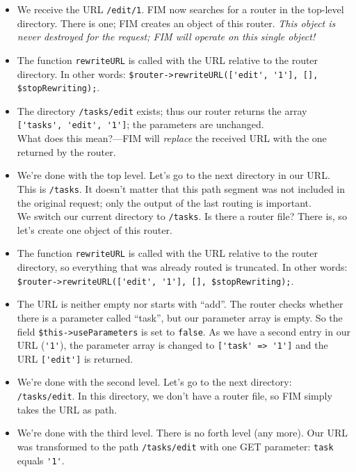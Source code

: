 \documentclass{scrartcl}
\begin{document}
      \begin{itemize}
         \item
            We receive the URL {\color{nbBlue}\texttt{/edit/1}}. FIM now searches for a router in the top-level directory. There is one; FIM creates an object of this router. \emph{This object is never destroyed for the request; FIM will operate on this single object!}
         \item
            The function \lstinline!rewriteURL! is called with the URL relative to the router directory. In other words:
            \lstinline!$router->rewriteURL(['edit', '1'], [], $stopRewriting);!.
         \item
            The directory {\color{nbGreen}\texttt{/tasks/edit}} exists; thus our router returns the array \lstinline!['tasks', 'edit', '1']!; the parameters are unchanged. \\
            What does this mean?---FIM will \emph{replace} the received URL with the one returned by the router.
         \item
            We're done with the top level. Let's go to the next directory in our URL. This is {\color{nbBlue}\texttt{/tasks}}. It doesn't matter that this path segment was not included in the original request; only the output of the last routing is important. \\
            We switch our current directory to {\color{nbGreen}\texttt{/tasks}}. Is there a router file? There is, so let's create one object of this router.
         \item
            The function \lstinline!rewriteURL! is called with the URL relative to the router directory, so everything that was already routed is truncated. In other words: \\
            \lstinline!$router->rewriteURL(['edit', '1'], [], $stopRewriting);!.
         \item
            The URL is neither empty nor starts with ``add''. The router checks whether there is a parameter called ``task'', but our parameter array is empty. So the field \lstinline!$this->useParameters! is set to \lstinline!false!.  As we have a second entry in our URL (\lstinline!'1'!), the parameter array is changed to \lstinline!['task' => '1']! and the URL \lstinline!['edit']! is returned.
         \item
            We're done with the second level. Let's go to the next directory: {\color{nbBlue}\texttt{/tasks/edit}}. In this directory, we don't have a router file, so FIM simply takes the URL as path.
         \item
            We're done with the third level. There is no forth level (any more). Our URL was transformed to the path {\color{nbGreen}\texttt{/tasks/edit}} with one GET parameter: \texttt{task} equals \lstinline!'1'!.
      \end{itemize}
\end{document}
